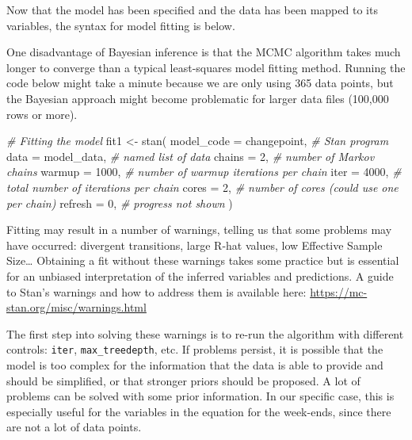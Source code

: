 \documentclass[
]{article}
\newenvironment{Shaded}{\begin{snugshade}}{\end{snugshade}}
\newcommand{\AttributeTok}[1]{\textcolor[rgb]{0.77,0.63,0.00}{#1}}
\newcommand{\CommentTok}[1]{\textcolor[rgb]{0.56,0.35,0.01}{\textit{#1}}}
\newcommand{\DecValTok}[1]{\textcolor[rgb]{0.00,0.00,0.81}{#1}}
\newcommand{\FunctionTok}[1]{\textcolor[rgb]{0.00,0.00,0.00}{#1}}
\newcommand{\NormalTok}[1]{#1}
\newcommand{\OtherTok}[1]{\textcolor[rgb]{0.56,0.35,0.01}{#1}}
\begin{document}
Now that the model has been specified and the data has been mapped to its variables, the syntax for model fitting is below.

One disadvantage of Bayesian inference is that the MCMC algorithm takes much longer to converge than a typical least-squares model fitting method. Running the code below might take a minute because we are only using 365 data points, but the Bayesian approach might become problematic for larger data files (100,000 rows or more).

\begin{Shaded}
\begin{Highlighting}[]
\CommentTok{\# Fitting the model}
\NormalTok{fit1 }\OtherTok{\textless{}{-}} \FunctionTok{stan}\NormalTok{(}
  \AttributeTok{model\_code =}\NormalTok{ changepoint,  }\CommentTok{\# Stan program}
  \AttributeTok{data =}\NormalTok{ model\_data,        }\CommentTok{\# named list of data}
  \AttributeTok{chains =} \DecValTok{2}\NormalTok{,               }\CommentTok{\# number of Markov chains}
  \AttributeTok{warmup =} \DecValTok{1000}\NormalTok{,            }\CommentTok{\# number of warmup iterations per chain}
  \AttributeTok{iter =} \DecValTok{4000}\NormalTok{,              }\CommentTok{\# total number of iterations per chain}
  \AttributeTok{cores =} \DecValTok{2}\NormalTok{,                }\CommentTok{\# number of cores (could use one per chain)}
  \AttributeTok{refresh =} \DecValTok{0}\NormalTok{,              }\CommentTok{\# progress not shown}
\NormalTok{)}
\end{Highlighting}
\end{Shaded}

Fitting may result in a number of warnings, telling us that some problems may have occurred: divergent transitions, large R-hat values, low Effective Sample Size\ldots{} Obtaining a fit without these warnings takes some practice but is essential for an unbiased interpretation of the inferred variables and predictions. A guide to Stan's warnings and how to address them is available here: \url{https://mc-stan.org/misc/warnings.html}

The first step into solving these warnings is to re-run the algorithm with different controls: \texttt{iter}, \texttt{max\_treedepth}, etc. If problems persist, it is possible that the model is too complex for the information that the data is able to provide and should be simplified, or that stronger priors should be proposed. A lot of problems can be solved with some prior information. In our specific case, this is especially useful for the variables in the equation for the week-ends, since there are not a lot of data points.
\end{document}
